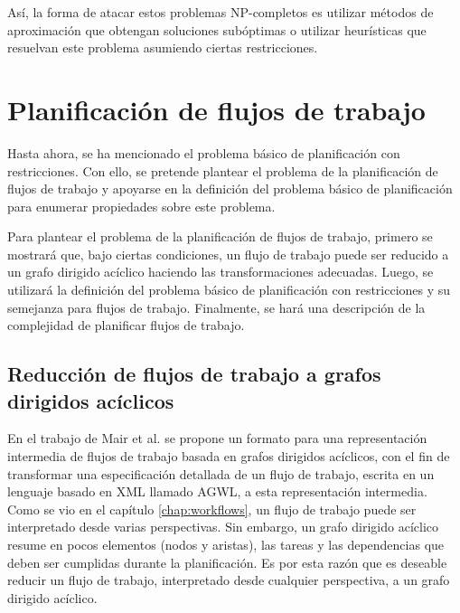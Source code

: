 Así, la forma de atacar estos problemas NP-completos es utilizar métodos de aproximación \cite{leiserson2001introduction} que obtengan soluciones subóptimas o utilizar heurísticas que resuelvan este problema asumiendo ciertas restricciones.

\section{Planificación de flujos de trabajo}
Hasta ahora, se ha mencionado el problema básico de planificación con restricciones. Con ello, se pretende plantear el problema de la planificación de flujos de trabajo y apoyarse en la definición del problema básico de planificación para enumerar propiedades sobre este problema.

Para plantear el problema de la planificación de flujos de trabajo, primero se mostrará que, bajo ciertas condiciones, un flujo de trabajo puede ser reducido a un grafo dirigido acíclico haciendo las transformaciones adecuadas. Luego, se utilizará la definición del problema básico de planificación con restricciones y su semejanza para flujos de trabajo. Finalmente, se hará una descripción de la complejidad de planificar flujos de trabajo.
\subsection{Reducción de flujos de trabajo a grafos dirigidos acíclicos}
En el trabajo de Mair et al. \cite{mair2007workflow} se propone un formato para una representación intermedia de flujos de trabajo basada en grafos dirigidos acíclicos, con el fin de transformar una especificación detallada de un flujo de trabajo, escrita en un lenguaje basado en XML llamado AGWL, a esta representación intermedia. Como se vio en el capítulo \ref{chap:workflows}, un flujo de trabajo puede ser interpretado desde varias perspectivas. Sin embargo, un grafo dirigido acíclico resume en pocos elementos (nodos y aristas), las tareas y las dependencias que deben ser cumplidas durante la planificación. Es por esta razón que es deseable reducir un flujo de trabajo, interpretado desde cualquier perspectiva, a un grafo dirigido acíclico.

